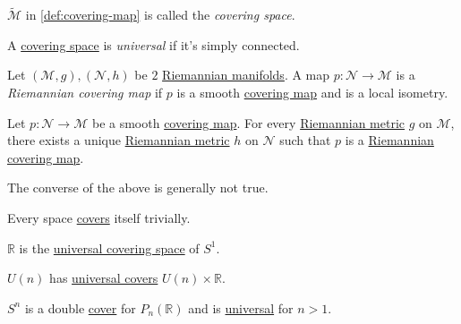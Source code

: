 \begin{notation}\label{not:covering-space}
	\(\widetilde{\mathcal{M}} \) in \autoref{def:covering-map} is called the \emph{covering space}.
\end{notation}

\begin{notation}\label{not:universal-covering-space}
	A \hyperref[not:covering-space]{covering space} is \emph{universal}	if it's simply connected.
\end{notation}

\begin{definition}\label{def:Riemannian-covering-map}
	Let \((\mathcal{M} , g), (\mathcal{N}, h )\) be \(2\) \hyperref[def:Riemannian-manifold]{Riemannian manifolds}. A map \(p\colon \mathcal{N} \to \mathcal{M} \) is a \emph{Riemannian covering map} if \(p\) is a smooth \hyperref[def:covering-map]{covering map} and is a local isometry.
\end{definition}

\begin{proposition}
	Let \(p\colon \mathcal{N} \to \mathcal{M} \) be a smooth \hyperref[def:covering-map]{covering map}. For every \hyperref[def:Riemannian-metric]{Riemannian metric} \(g\) on \(\mathcal{M} \), there exists a unique \hyperref[def:Riemannian-metric]{Riemannian metric} \(h\) on \(\mathcal{N} \) such that \(p\) is a \hyperref[def:Riemannian-covering-map]{Riemannian covering map}.
\end{proposition}

\begin{note}
	The converse of the above is generally not true.
\end{note}

\begin{eg}
	Every space \hyperref[def:covering-map]{covers} itself trivially.
\end{eg}

\begin{eg}
	\(\mathbb{R} \) is the \hyperref[not:universal-covering-space]{universal covering space} of \(S^1\).
\end{eg}

\begin{eg}
	\(U(n)\) has \hyperref[not:universal-covering-space]{universal covers} \(U(n) \times \mathbb{R} \).
\end{eg}

\begin{eg}
	\(S^n\) is a double \hyperref[not:covering-space]{cover} for \(P_n(\mathbb{R} )\) and is \hyperref[not:universal-covering-space]{universal} for \(n > 1\).
\end{eg}

